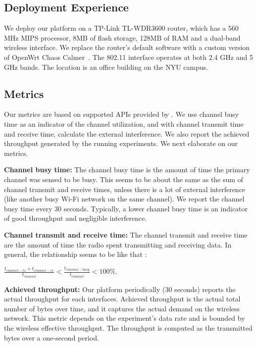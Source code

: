 \subsection{Deployment Experience}
\label{ssec.deployment}
We deploy our platform on a TP-Link TL-WDR3600 router, which has a 560 MHz MIPS processor, 8MB of flash storage, 128MB of RAM and a dual-band wireless interface. We replace the router's default software with a custom version of OpenWrt Chaos Calmer~\cite{openwrt}. The 802.11 interface operates at both 2.4 GHz and 5 GHz bands. The location is an office building on the NYU campus. 

\subsection{Metrics}
\label{ssec.metrics}

Our metrics are based on supported APIs provided by \sysname. We use channel busy time as an indicator of the channel utilization, and with channel transmit time and receive time, calculate the external interference. We also report the achieved throughput generated by the running experiments. We next elaborate on our metrics.

\textbf{Channel busy time:} The channel busy time is the amount of time the primary channel was sensed to be busy. This seems to be about the same as the sum of channel transmit and receive times, unless there is a lot of external interference (like another busy Wi-Fi network on the same channel)\cite{channelsurvey}. We report the channel busy time every 30 seconds. Typically, a lower channel busy time is an indicator of good throughput and negligible interference.

\textbf{Channel transmit and receive time:} The channel transmit and receive time are the amount of time the radio spent transmitting and receiving data. In general, the relationship seems to be like that \cite{cfg80211}: 

\(\frac{t_{channel-tx} + t_{channel-rx}}{t_{channel}} < \frac{t_{channel-busy}}{t_{channel}} < 100\%\).

\textbf{Achieved throughput:} Our platform periodically (30 seconds) reports the actual throughput for each interfaces. Achieved throughput is the actual total number of bytes over time, and it captures the actual demand on the wireless network. This metric depends on the experiment's data rate and is bounded by the wireless effective throughput. The throughput is computed as the transmitted bytes over a one-second period.

